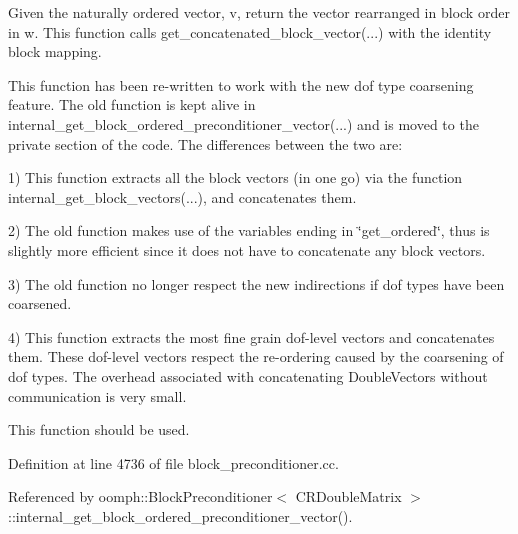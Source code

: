 Given the naturally ordered vector, v, return the vector rearranged in block order in w. This function calls get\+\_\+concatenated\+\_\+block\+\_\+vector(...) with the identity block mapping. 

This function has been re-\/written to work with the new dof type coarsening feature. The old function is kept alive in internal\+\_\+get\+\_\+block\+\_\+ordered\+\_\+preconditioner\+\_\+vector(...) and is moved to the private section of the code. The differences between the two are\+:

1) This function extracts all the block vectors (in one go) via the function internal\+\_\+get\+\_\+block\+\_\+vectors(...), and concatenates them.

2) The old function makes use of the variables ending in \char`\"{}get\+\_\+ordered\char`\"{}, thus is slightly more efficient since it does not have to concatenate any block vectors.

3) The old function no longer respect the new indirections if dof types have been coarsened.

4) This function extracts the most fine grain dof-\/level vectors and concatenates them. These dof-\/level vectors respect the re-\/ordering caused by the coarsening of dof types. The overhead associated with concatenating Double\+Vectors without communication is very small.

This function should be used. 

Definition at line 4736 of file block\+\_\+preconditioner.\+cc.



Referenced by oomph\+::\+Block\+Preconditioner$<$ C\+R\+Double\+Matrix $>$\+::internal\+\_\+get\+\_\+block\+\_\+ordered\+\_\+preconditioner\+\_\+vector().

\mbox{\label{classoomph_1_1BlockPreconditioner_a9dae351352d344321ea82999d7003e17}} 
